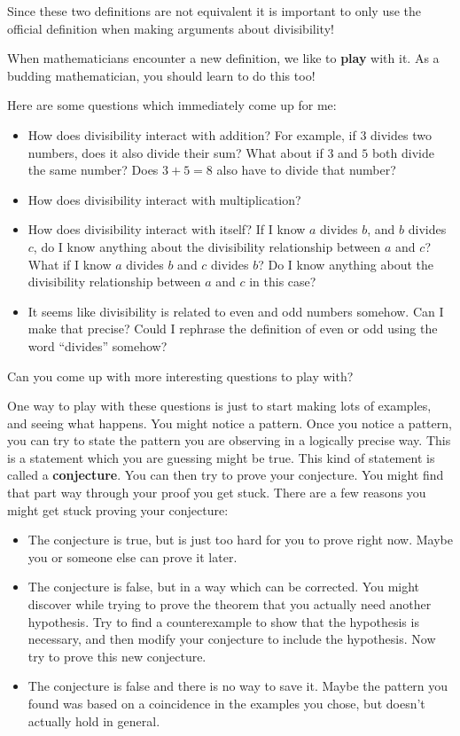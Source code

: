 Since these two definitions are not equivalent it is important to only use the official definition when making arguments about divisibility!

When mathematicians encounter a new definition, we like to \textbf{play} with it.  As a budding mathematician, you should learn to do this too!

Here are some questions which immediately come up for me:

\begin{itemize}
	\item How does divisibility interact with addition?  For example, if $3$ divides two numbers, does it also divide their sum?  What about if $3$ and $5$ both divide the same number?  Does $3+5 = 8$ also have to divide that number?
	\item How does divisibility interact with multiplication?
	\item How does divisibility interact with itself?  If I know $a$ divides $b$, and $b$ divides $c$, do I know anything about the divisibility relationship between $a$ and $c$?  What if I know $a$ divides $b$ and $c$ divides $b$?  Do I know anything about the divisibility relationship between $a$ and $c$ in this case?
	\item It seems like divisibility is related to even and odd numbers somehow.  Can I make that precise?  Could I rephrase the definition of even or odd using the word ``divides'' somehow?
\end{itemize}

Can you come up with more interesting questions to play with?

One way to play with these questions is just to start making lots of examples, and seeing what happens.  You might notice a pattern.  Once you notice a pattern, you can try to state the pattern you are observing in a logically precise way.  This is a statement which you are guessing might be true.  This kind of statement is called a \textbf{conjecture}.  You can then try to prove your conjecture.  You might find that part way through your proof you get stuck.  There are a few reasons you might get stuck proving your conjecture:

\begin{itemize}
	\item The conjecture is true, but is just too hard for you to prove right now.  Maybe you or someone else can prove it later.
	\item The conjecture is false, but in a way which can be corrected.  You might discover while trying to prove the theorem that you actually need another hypothesis.  Try to find a counterexample to show that the hypothesis is necessary, and then modify your conjecture to include the hypothesis.  Now try to prove this new conjecture.
	\item The conjecture is false and there is no way to save it.  Maybe the pattern you found was based on a coincidence in the examples you chose, but doesn't actually hold in general.
\end{itemize}

